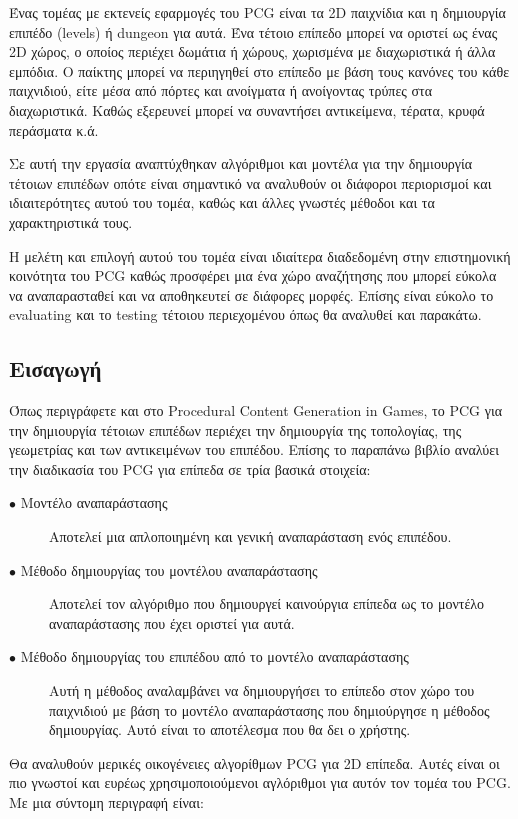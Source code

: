 Ένας τομέας με εκτενείς εφαρμογές του PCG είναι τα 2D παιχνίδια και η δημιουργία επιπέδο (levels) ή dungeon για αυτά. Ένα τέτοιο επίπεδο μπορεί να οριστεί ως ένας 2D χώρος, ο οποίος περιέχει δωμάτια ή χώρους, χωρισμένα με διαχωριστικά ή άλλα εμπόδια. Ο παίκτης μπορεί να περιηγηθεί στο επίπεδο με βάση τους κανόνες του κάθε παιχνιδιού, είτε μέσα από πόρτες και ανοίγματα ή ανοίγοντας τρύπες στα διαχωριστικά. Καθώς εξερευνεί μπορεί να συναντήσει αντικείμενα, τέρατα, κρυφά περάσματα κ.ά. 
\par
Σε αυτή την εργασία αναπτύχθηκαν αλγόριθμοι και μοντέλα για την δημιουργία τέτοιων επιπέδων οπότε είναι σημαντικό να αναλυθούν οι διάφοροι περιορισμοί και ιδιαιτερότητες αυτού του τομέα, καθώς και άλλες γνωστές μέθοδοι και τα χαρακτηριστικά τους.
\par
Η μελέτη και επιλογή αυτού του τομέα είναι ιδιαίτερα διαδεδομένη στην επιστημονική κοινότητα του PCG καθώς προσφέρει μια ένα χώρο αναζήτησης που μπορεί εύκολα να αναπαρασταθεί και να αποθηκευτεί σε διάφορες μορφές. Επίσης είναι εύκολο το evaluating και το testing τέτοιου περιεχομένου όπως θα αναλυθεί και παρακάτω.

\subsection{Εισαγωγή}
Όπως περιγράφετε και στο Procedural Content Generation in Games, το PCG για την δημιουργία τέτοιων επιπέδων περιέχει την δημιουργία της τοπολογίας, της γεωμετρίας και των αντικειμένων του επιπέδου. Επίσης το παραπάνω βιβλίο αναλύει την διαδικασία του PCG για επίπεδα σε τρία βασικά στοιχεία:

\begin{description}
  \item[$\bullet$ Μοντέλο αναπαράστασης] Αποτελεί μια απλοποιημένη και γενική αναπαράσταση ενός επιπέδου.
  \item[$\bullet$ Μέθοδο δημιουργίας του μοντέλου αναπαράστασης] Αποτελεί τον αλγόριθμο που δημιουργεί καινούργια επίπεδα ως το μοντέλο αναπαράστασης που έχει οριστεί για αυτά. 
    \item[$\bullet$ Μέθοδο δημιουργίας του επιπέδου από το μοντέλο αναπαράστασης] Αυτή η μέθοδος αναλαμβάνει να δημιουργήσει το επίπεδο στον χώρο του παιχνιδιού με βάση το μοντέλο αναπαράστασης που δημιούργησε η μέθοδος δημιουργίας. Αυτό είναι το αποτέλεσμα που θα δει ο χρήστης.
\end{description}

Θα αναλυθούν μερικές οικογένειες αλγορίθμων PCG για 2D επίπεδα. Αυτές είναι οι πιο γνωστοί και ευρέως χρησιμοποιούμενοι αγλόριθμοι για αυτόν τον τομέα του PCG. Με μια σύντομη περιγραφή είναι:

